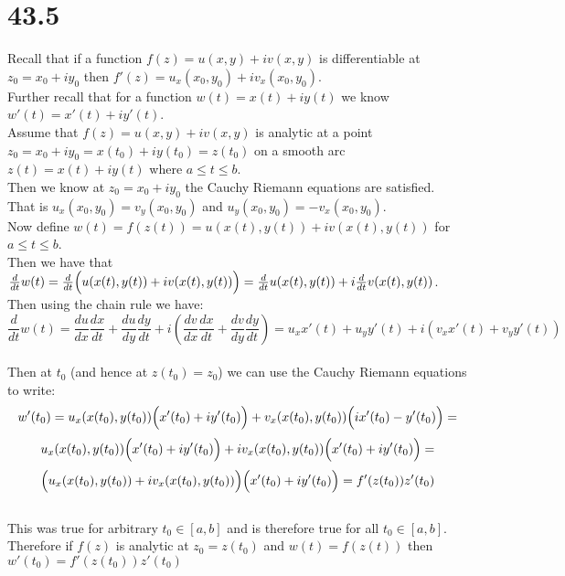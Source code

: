 \documentclass{article}
\begin{document}
\section*{43.5}
\begin{center}
    \doublespacing
    Recall that if a function $f(z) = u(x, y) + iv(x, y)$ is differentiable at $z_0 = x_0 + iy_0$ then $f'(z) = u_x (x_0, y_0) + iv_x (x_0, y_0)$.
    \\Further recall that for a function $w(t) = x(t) + iy(t)$ we know $w'(t) = x'(t) + iy'(t)$.
    \break
    \\Assume that $f(z) = u(x, y) + iv(x, y)$ is analytic at a point $z_0 = x_0 + iy_0 = x(t_0) + iy(t_0) = z(t_0)$ on a smooth arc $z(t) = x(t) + iy(t)$ where $a\leq t\leq b$.
    \break
    \\Then we know at $z_0 = x_0 + iy_0$ the Cauchy Riemann equations are satisfied.
    \\That is $u_x (x_0, y_0) = v_y (x_0, y_0)$ and $u_y (x_0, y_0) = -v_x (x_0, y_0)$.
    \\Now define $w(t) = f(z(t)) = u(x(t), y(t)) + iv(x(t), y(t))$ for $a\leq t\leq b$.
    \\Then we have that $\frac{d}{dt} w(t) =\frac{d}{dt}\Big{(}u(x(t), y(t)) + iv(x(t), y(t))\Big{)} =\frac{d}{dt} u(x(t), y(t)) + i\frac{d}{dt} v(x(t), y(t))$.
    \break
    \\Then using the chain rule we have:
    \[\frac{d}{dt} w(t) =\frac{du}{dx}\frac{dx}{dt} +\frac{du}{dy}\frac{dy}{dt} + i(\frac{dv}{dx}\frac{dx}{dt} +\frac{dv}{dy}\frac{dy}{dt}) = u_x x'(t) + u_y y'(t) + i(v_x x'(t) + v_y y'(t))\]
    \\Then at $t_0$ (and hence at $z(t_0) = z_0$) we can use the Cauchy Riemann equations to write:
    \[w'(t_0) = u_x (x(t_0), y(t_0))\Big{(}x'(t_0) + iy'(t_0)\Big{)} + v_x (x(t_0), y(t_0))\Big{(}ix'(t_0) - y'(t_0)\Big{)} =\]
    \[u_x (x(t_0), y(t_0))\Big{(}x'(t_0) + iy'(t_0)\Big{)} + iv_x (x(t_0), y(t_0))\Big{(}x'(t_0) + iy'(t_0)\Big{)} =\]
    \[\Big{(} u_x (x(t_0), y(t_0)) + iv_x (x(t_0), y(t_0))\Big{)}\Big{(}x'(t_0) + iy'(t_0)\Big{)} = f'(z(t_0))z'(t_0)\]
    \\This was true for arbitrary $t_0\in [a, b]$ and is therefore true for all $t_0\in [a, b]$.
    \break
    \\Therefore if $f(z)$ is analytic at $z_0 = z(t_0)$ and $w(t) = f(z(t))$ then $w'(t_0) = f'(z(t_0))z'(t_0)$ \qedsymbol
\end{center}


\newpage
\end{document}
